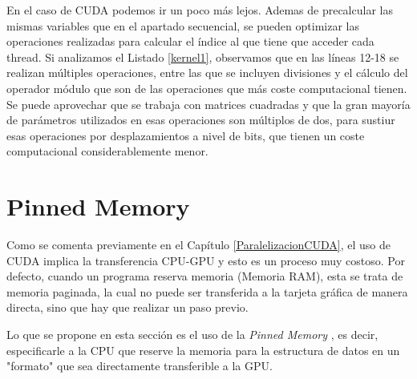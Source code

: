En el caso de CUDA podemos ir un poco más lejos. Ademas de precalcular las mismas variables que en el apartado secuencial, se pueden optimizar las operaciones realizadas para calcular el índice al que tiene que acceder cada thread. Si analizamos el Listado \ref{kernel1}, observamos que en las líneas 12-18 se realizan múltiples operaciones, entre las que se incluyen divisiones y el cálculo del operador módulo que son de las operaciones que más coste computacional tienen. Se puede aprovechar que se trabaja con matrices cuadradas y que la gran mayoría de parámetros utilizados en esas operaciones son múltiplos de dos, para sustiur esas operaciones por desplazamientos a nivel de bits, que tienen un coste computacional considerablemente menor.

\section{Pinned Memory}

Como se comenta previamente en el Capítulo \ref{ParalelizacionCUDA}, el uso de CUDA implica la transferencia CPU-GPU y esto es un proceso muy costoso. Por defecto, cuando un programa reserva memoria (Memoria RAM), esta se trata de memoria paginada, la cual no puede ser transferida a la tarjeta gráfica de manera directa, sino que hay que realizar un paso previo. 

Lo que se propone en esta sección es el uso de la \textit{Pinned Memory} \cite{unknown-author-2020}, es decir, especificarle a la CPU que reserve la memoria para la estructura de datos en un "formato"  que sea directamente transferible a la GPU.